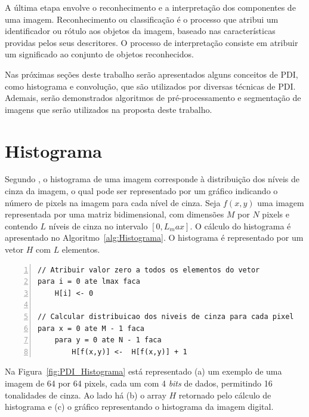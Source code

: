 \documentclass[12pt,oneside,a4paper,english,french,spanish,brazil,]{abntex2}
\begin{document}
A última etapa envolve o reconhecimento e a interpretação dos componentes de uma imagem. Reconhecimento ou classificação é o processo que atribui um identificador ou rótulo aos objetos da imagem, baseado nas características providas pelos seus descritores. O processo de interpretação consiste em atribuir um significado ao conjunto de objetos reconhecidos.

Nas próximas seções deste trabalho serão apresentados alguns conceitos de PDI, como histograma e convolução, que são utilizados por diversas técnicas de PDI. Ademais, serão demonstrados algoritmos de pré-processamento e segmentação de imagens que serão utilizados na proposta deste trabalho.

\section{Histograma}

Segundo \citet{pedrini:2008}, o histograma de uma imagem corresponde à distribuição dos níveis de cinza da imagem, o qual pode ser representado por um gráfico indicando o número de pixels na imagem para cada nível de cinza. Seja \(f(x,y)\) uma imagem representada por uma matriz bidimensional, com dimensões \(M\) por \(N\) pixels e contendo \(L\) níveis de cinza no intervalo \([0, L_max]\). O cálculo do histograma é apresentado no Algoritmo~\ref{alg:Histograma}. O histograma é representado por um vetor \(H\) com \(L\) elementos.

\begin{minipage}{\linewidth}
\begin{lstlisting}[caption={Cálculo do histograma de uma imagem em tons de cinza}, label=alg:Histograma, numbers=left]
// Atribuir valor zero a todos os elementos do vetor
para i = 0 ate lmax faca
    H[i] <- 0
    
// Calcular distribuicao dos niveis de cinza para cada pixel
para x = 0 ate M - 1 faca
    para y = 0 ate N - 1 faca
        H[f(x,y)] <-  H[f(x,y)] + 1
\end{lstlisting}
\end{minipage}

Na Figura~\ref{fig:PDI_Histograma} está representado (a) um exemplo de uma imagem de 64 por 64 pixels, cada um com 4 \textit{bits} de dados, permitindo 16 tonalidades de cinza. Ao lado há (b) o array \(H\) retornado pelo cálculo de histograma e (c) o gráfico representando o histograma da imagem digital.
\end{document}
